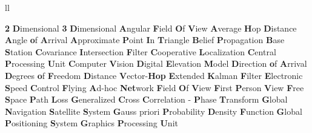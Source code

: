\begin{abbreviations}{ll} %
    
    			{\textbf{2} \textbf{D}imensional}
    			{\textbf{3} \textbf{D}imensional}
    		{\textbf{A}ngular \textbf{F}ield \textbf{O}f \textbf{V}iew}
    		{\textbf{A}verage \textbf{H}op \textbf{D}istance} 
    		{\textbf{A}ngle \textbf{o}f \textbf{A}rrival}
    		{\textbf{A}pproximate \textbf{P}oint \textbf{I}n \textbf{T}riangle}
    			{\textbf{B}elief \textbf{P}ropagation} 
    			{\textbf{B}ase \textbf{S}tation}
    		{\textbf{C}ovariance \textbf{I}ntersection \textbf{F}ilter}   
    		    {\textbf{C}ooperative \textbf{L}ocalization}
    		{\textbf{C}entral \textbf{P}rocessing \textbf{U}nit}
    		    {\textbf{C}omputer \textbf{V}ision}
    		{\textbf{D}igital \textbf{E}levation \textbf{M}odel}
    		{\textbf{D}irection \textbf{o}f \textbf{A}rrival}
    		{\textbf{D}egrees \textbf{o}f \textbf{F}reedom}
    		{\textbf{D}istance \textbf{V}ector-\textbf{Hop}}
    		{\textbf{E}xtended \textbf{K}alman \textbf{F}ilter}
    		{\textbf{E}lectronic \textbf{S}peed \textbf{C}ontrol}
    		{\textbf{F}lying \textbf{A}d-hoc \textbf{Net}work}
    		{\textbf{F}ield \textbf{O}f \textbf{V}iew}
    		{\textbf{F}irst \textbf{P}erson \textbf{V}iew}
    		{\textbf{F}ree \textbf{S}pace \textbf{P}ath \textbf{L}oss}
    	{\textbf{G}eneralized \textbf{C}ross \textbf{C}orrelation - \textbf{P}hase \textbf{T}ransform}
    		{\textbf{G}lobal \textbf{N}avigation \textbf{S}atellite \textbf{S}ystem}
    		{\textbf{G}auss priori \textbf{P}robability \textbf{D}ensity \textbf{F}unction}
    		{\textbf{G}lobal \textbf{P}ositioning \textbf{S}ystem}
    		{\textbf{G}raphics \textbf{P}rocessing \textbf{U}nit}

\end{abbreviations}

